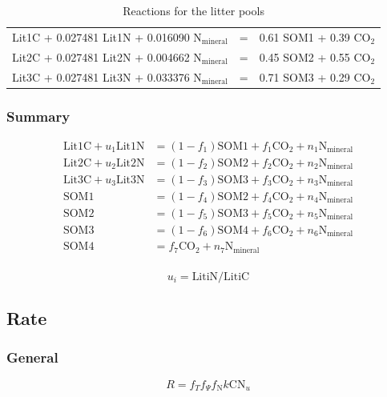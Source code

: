 \documentclass[12pt, a4paper]{article}
\begin{document}
\begin{table}[h]
\caption{Reactions for the litter pools}
\begin{center}
\begin{tabular}{lll}
Lit1C + 0.027481 Lit1N + 0.016090 $\text{N}_\text{mineral}$ & = & 0.61 SOM1 + 0.39 $\text{CO}_2$  \\
Lit2C + 0.027481 Lit2N + 0.004662 $\text{N}_\text{mineral}$ & = & 0.45 SOM2 + 0.55 $\text{CO}_2$  \\
Lit3C + 0.027481 Lit3N + 0.033376 $\text{N}_\text{mineral}$ & = & 0.71 SOM3 + 0.29 $\text{CO}_2$  \\
\end{tabular}
\end{center}
\label{LitterReactions}
\end{table}

\subsubsection{Summary}
\begin{align*}
\text{Lit1C} + u_1 \text {Lit1N} & = \left(1-f_1\right) \text{SOM1} + f_1 \text{CO}_2 + n_1 \text{N}_\text{mineral} \\
\text{Lit2C} + u_2 \text {Lit2N} & = \left(1-f_2\right) \text{SOM2} + f_2 \text{CO}_2 + n_2 \text{N}_\text{mineral} \\
\text{Lit3C} + u_3 \text {Lit3N} & = \left(1-f_3\right) \text{SOM3} + f_3 \text{CO}_2 + n_3 \text{N}_\text{mineral} \\
\text{SOM1} & = \left(1-f_4\right) \text{SOM2} + f_4 \text{CO}_2 + n_4 \text{N}_\text{mineral} \\
\text{SOM2} & = \left(1-f_5\right) \text{SOM3} + f_5 \text{CO}_2 + n_5 \text{N}_\text{mineral} \\
\text{SOM3} & = \left(1-f_6\right) \text{SOM4} + f_6 \text{CO}_2 + n_6 \text{N}_\text{mineral} \\
\text{SOM4} & = f_7 \text{CO}_2 + n_7 \text{N}_\text{mineral} \\
\end{align*}

\begin{equation*}
u_i = \text{LitiN}/\text{LitiC}
\end{equation*}

\subsection{Rate}
\subsubsection{General}
\begin{equation}
\label{clmcn_rate}
R = f_T f_\Psi f_\text{N} k \text{CN}_u
\end{equation}
\end{document}

